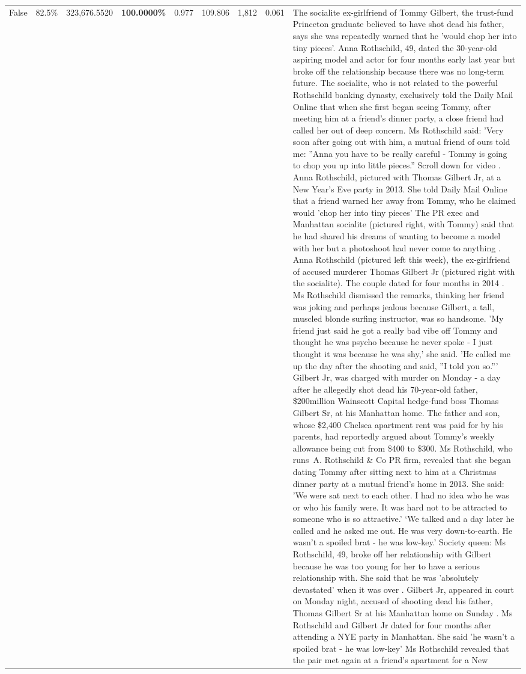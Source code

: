 \begin{table}[H]
\begin{tabular}{lllrlllll}
False & 82.5\% & 323,676.5520 & \bfseries \color{red} 100.0000\% & 0.977 & 109.806 & 1,812 & 0.061 & The socialite ex-girlfriend of Tommy Gilbert, the trust-fund Princeton graduate believed to have shot dead his father, says she was repeatedly warned that he 'would chop her into tiny pieces'. Anna Rothschild, 49, dated the 30-year-old aspiring model and actor for four months early last year but broke off the relationship because there was no long-term future. The socialite, who is not related to the powerful Rothschild banking dynasty, exclusively told the Daily Mail Online that when she first began seeing Tommy, after meeting him at a friend's dinner party, a close friend had called her out of deep concern. Ms Rothschild said: 'Very soon after going out with him, a mutual friend of ours told me: ''Anna you have to be really careful - Tommy is going to chop you up into little pieces.'' Scroll down for video . Anna Rothschild, pictured with Thomas Gilbert Jr, at a New Year's Eve party in 2013. She told Daily Mail Online that a friend warned her away from Tommy, who he claimed would 'chop her into tiny pieces' The PR exec and Manhattan socialite (pictured right, with Tommy) said that he had shared his dreams of wanting to become a model with her but a photoshoot had never come to anything . Anna Rothschild (pictured left this week), the ex-girlfriend of accused murderer Thomas Gilbert Jr (pictured right with the socialite). The couple dated for four months in 2014 . Ms Rothschild dismissed the remarks, thinking her friend was joking and perhaps jealous because Gilbert, a tall, muscled blonde surfing instructor, was so handsome. 'My friend just said he got a really bad vibe off Tommy and thought he was psycho because he never spoke - I just thought it was because he was shy,' she said. 'He called me up the day after the shooting and said, ''I told you so.''' Gilbert Jr, was charged with murder on Monday - a day after he allegedly shot dead his 70-year-old father, \$200million Wainscott Capital hedge-fund boss Thomas Gilbert Sr, at his Manhattan home. The father and son, whose \$2,400 Chelsea apartment rent was paid for by his parents, had reportedly argued about Tommy's weekly allowance being cut from \$400 to \$300. Ms Rothschild, who runs A. Rothschild \& Co PR firm, revealed that she began dating Tommy after sitting next to him at a Christmas dinner party at a mutual friend's home in 2013. She said: 'We were sat next to each other. I had no idea who he was or who his family were. It was hard not to be attracted to someone who is so attractive.' ‘We talked and a day later he called and he asked me out. He was very down-to-earth. He wasn’t a spoiled brat - he was low-key.’ Society queen: Ms Rothschild, 49, broke off her relationship with Gilbert because he was too young for her to have a serious relationship with. She said that he was 'absolutely devastated' when it was over . Gilbert Jr, appeared in court on Monday night, accused of shooting dead his father, Thomas Gilbert Sr at his Manhattan home on Sunday . Ms Rothschild and Gilbert Jr dated for four months after attending a NYE party in Manhattan. She said 'he wasn't a spoiled brat - he was low-key' Ms Rothschild revealed that the pair met again at a friend’s apartment for a New 
\end{tabular}
\end{table}
